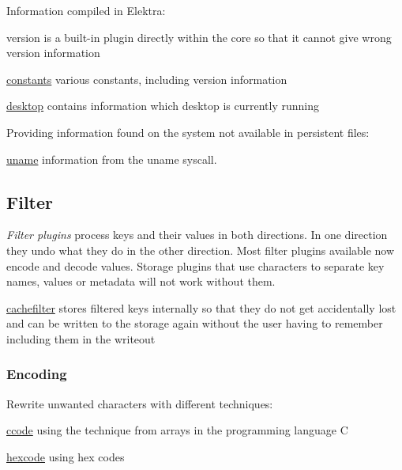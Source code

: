 Information compiled in Elektra\+:
\begin{DoxyItemize}
\item version is a built-\/in plugin directly within the core so that it cannot give wrong version information
\item \hyperlink{md_src_plugins_constants_README_src_plugins_constants_README_md}{constants} various constants, including version information
\item \hyperlink{md_src_plugins_desktop_README_src_plugins_desktop_README_md}{desktop} contains information which desktop is currently running
\end{DoxyItemize}

Providing information found on the system not available in persistent files\+:


\begin{DoxyItemize}
\item \hyperlink{md_src_plugins_uname_README_src_plugins_uname_README_md}{uname} information from the uname syscall.
\end{DoxyItemize}

\subsection*{Filter}

{\itshape Filter plugins} process keys and their values in both directions. In one direction they undo what they do in the other direction. Most filter plugins available now encode and decode values. Storage plugins that use characters to separate key names, values or metadata will not work without them.


\begin{DoxyItemize}
\item \hyperlink{md_src_plugins_cachefilter_README_src_plugins_cachefilter_README_md}{cachefilter} stores filtered keys internally so that they do not get accidentally lost and can be written to the storage again without the user having to remember including them in the writeout
\end{DoxyItemize}

\subsubsection*{Encoding}

Rewrite unwanted characters with different techniques\+:


\begin{DoxyItemize}
\item \hyperlink{md_src_plugins_ccode_README_src_plugins_ccode_README_md}{ccode} using the technique from arrays in the programming language C
\item \hyperlink{md_src_plugins_hexcode_README_src_plugins_hexcode_README_md}{hexcode} using hex codes
\end{DoxyItemize}

